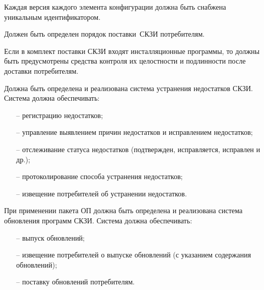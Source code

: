 \label{R.LC.CMVersion} %
Каждая версия каждого элемента конфигурации 
должна быть снабжена уникальным идентификатором. 

\label{R.LC.Delivery} %
Должен быть определен порядок поставки~СКЗИ потребителям.  

\label{R.LC.Authenticode} %
Если в комплект поставки СКЗИ входят инсталляционные программы, то должны быть
предусмотрены средства контроля их целостности и подлинности после доставки
потребителям.

\label{R.LC.FlawRemediation} %
Должна быть определена и реализована система устранения недостатков СКЗИ.
%
Система должна обеспечивать:
\begin{itemize}
\item[--]
регистрацию недостатков;
\item[--]
управление выявлением причин недостатков и исправлением недостатков;
\item[--]
отслеживание статуса недостатков 
(подтвержден, исправляется, исправлен и др.);
\item[--]
протоколирование способа устранения недостатков;
\item[--]
извещение потребителей об устранении недостатков.
\end{itemize}

\label{R.LC.SU} %
При применении пакета ОП должна быть определена и реализована система 
обновления программ СКЗИ. 
%
Система должна обеспечивать:
\begin{itemize}
\item[--]
выпуск обновлений;
\item[--]
извещение потребителей о выпуске обновлений (с указанием содержания 
обновлений);  
\item[--]
поставку обновлений потребителям.
\end{itemize}

